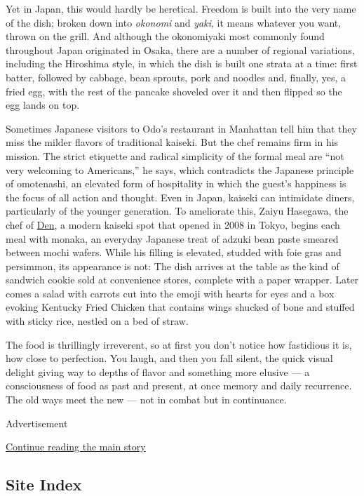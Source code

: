 Yet in Japan, this would hardly be heretical. Freedom is built into the
very name of the dish; broken down into \emph{okonomi} and \emph{yaki},
it means whatever you want, thrown on the grill. And although the
okonomiyaki most commonly found throughout Japan originated in Osaka,
there are a number of regional variations, including the Hiroshima
style, in which the dish is built one strata at a time: first batter,
followed by cabbage, bean sprouts, pork and noodles and, finally, yes, a
fried egg, with the rest of the pancake shoveled over it and then
flipped so the egg lands on top.

Sometimes Japanese visitors to Odo's restaurant in Manhattan tell him
that they miss the milder flavors of traditional kaiseki. But the chef
remains firm in his mission. The strict etiquette and radical simplicity
of the formal meal are ``not very welcoming to Americans,'' he says,
which contradicts the Japanese principle of omotenashi, an elevated form
of hospitality in which the guest's happiness is the focus of all action
and thought. Even in Japan, kaiseki can intimidate diners, particularly
of the younger generation. To ameliorate this, Zaiyu Hasegawa, the chef
of \href{https://www.jimbochoden.com/en/}{Den}, a modern kaiseki spot
that opened in 2008 in Tokyo, begins each meal with monaka, an everyday
Japanese treat of adzuki bean paste smeared between mochi wafers. While
his filling is elevated, studded with foie gras and persimmon, its
appearance is not: The dish arrives at the table as the kind of sandwich
cookie sold at convenience stores, complete with a paper wrapper. Later
comes a salad with carrots cut into the emoji with hearts for eyes and a
box evoking Kentucky Fried Chicken that contains wings shucked of bone
and stuffed with sticky rice, nestled on a bed of straw.

The food is thrillingly irreverent, so at first you don't notice how
fastidious it is, how close to perfection. You laugh, and then you fall
silent, the quick visual delight giving way to depths of flavor and
something more elusive --- a consciousness of food as past and present,
at once memory and daily recurrence. The old ways meet the new --- not
in combat but in continuance.

Advertisement

\protect\hyperlink{after-bottom}{Continue reading the main story}

\hypertarget{site-index}{%
\subsection{Site Index}\label{site-index}}

